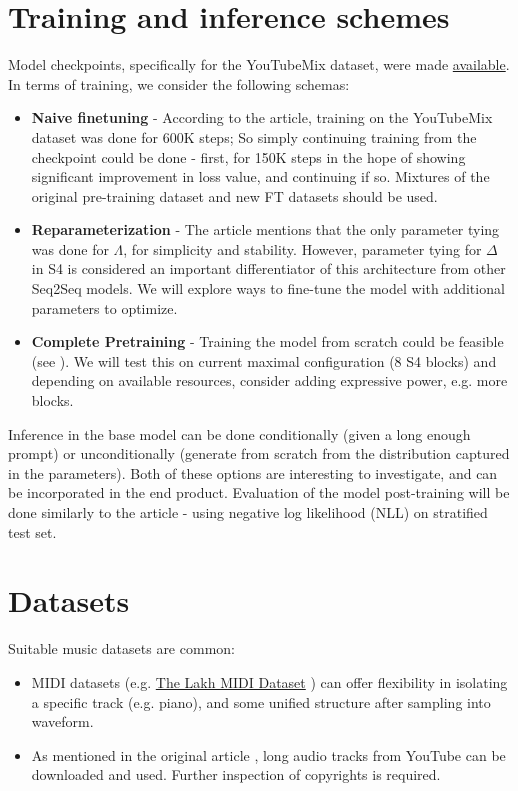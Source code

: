 \documentclass[12pt]{article}
\begin{document}
\section{Training and inference schemes}
Model checkpoints, specifically for the YouTubeMix dataset, were made \href{https://huggingface.co/krandiash/sashimi-release}{available}.\\
In terms of training, we consider the following schemas:
\begin{itemize}
    \item \textbf{Naive finetuning} - According to the article, training on the YouTubeMix dataset was done for 600K steps; So simply continuing training from the checkpoint could be done - first, for 150K steps in the hope of showing significant improvement in loss value, and continuing if so. Mixtures of the original pre-training dataset and new FT datasets should be used.
    \item \textbf{Reparameterization} - The article mentions that the only parameter tying was done for $\Lambda $, for simplicity and stability. However, parameter tying for $\Delta$ in S4 is considered an important differentiator of this architecture from other Seq2Seq models. We will explore ways to fine-tune the model with additional parameters to optimize.
    \item \textbf{Complete Pretraining} - Training the model from scratch could be feasible (see ). We will test this on current maximal configuration (8 S4 blocks) and depending on available resources, consider adding expressive power, e.g. more blocks.
\end{itemize} 
Inference in the base model can be done conditionally (given a long enough prompt) or unconditionally (generate from scratch from the distribution captured in the parameters). Both of these options are interesting to investigate, and can be incorporated in the end product.
Evaluation of the model post-training will be done similarly to the article - using negative log likelihood (NLL) on stratified test set.
\section{Datasets}
Suitable music datasets are common:
\begin{itemize}
    \item MIDI datasets (e.g. \href{https://colinraffel.com/projects/lmd/}{The Lakh MIDI Dataset} \cite{https://doi.org/10.7916/d8n58mhv}) can offer flexibility in isolating a specific track (e.g. piano), and some unified structure after sampling into waveform.
    \item As mentioned in the original article \cite{goel2022itsrawaudiogeneration}, long audio tracks from YouTube can be downloaded and used. Further inspection of copyrights is required.
\end{itemize}
\end{document}
